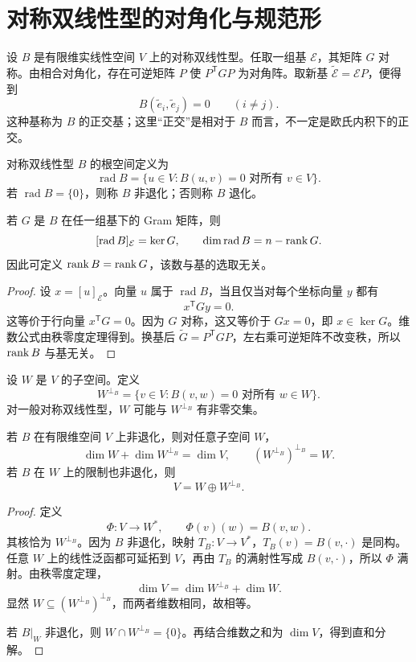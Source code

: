 \section{对称双线性型的对角化与规范形}

设 $B$ 是有限维实线性空间 $V$ 上的对称双线性型。任取一组基 $\mathcal E$，其矩阵 $G$ 对称。由相合对角化，存在可逆矩阵 $P$ 使 $P^{\mathsf T}GP$ 为对角阵。取新基 $\widetilde{\mathcal E}=\mathcal E P$，便得到
\[
B(\widetilde e_i,\widetilde e_j)=0\qquad(i\ne j).
\]
这种基称为 $B$ 的正交基；这里“正交”是相对于 $B$ 而言，不一定是欧氏内积下的正交。

\begin{definition}[根空间与非退化性]
对称双线性型 $B$ 的根空间定义为
\[
\operatorname{rad}B
=\{u\in V:B(u,v)=0\text{ 对所有 }v\in V\}.
\]
若 $\operatorname{rad}B=\{0\}$，则称 $B$ 非退化；否则称 $B$ 退化。
\end{definition}

\begin{proposition}
若 $G$ 是 $B$ 在任一组基下的 Gram 矩阵，则
\[
[\operatorname{rad}B]_{\mathcal E}=\ker G,\qquad
\dim\operatorname{rad}B=n-\operatorname{rank} G.
\]
因此可定义 $\operatorname{rank} B=\operatorname{rank} G$，该数与基的选取无关。
\end{proposition}
\begin{proof}
设 $x=[u]_{\mathcal E}$。向量 $u$ 属于 $\operatorname{rad}B$，当且仅当对每个坐标向量 $y$ 都有
\[
x^{\mathsf T}Gy=0.
\]
这等价于行向量 $x^{\mathsf T}G=0$。因为 $G$ 对称，这又等价于 $Gx=0$，即 $x\in\ker G$。维数公式由秩零度定理得到。换基后 $\widetilde G=P^{\mathsf T}GP$，左右乘可逆矩阵不改变秩，所以 $\operatorname{rank} B$ 与基无关。
\end{proof}

\begin{definition}[$B$-正交补]
设 $W$ 是 $V$ 的子空间。定义
\[
W^{\perp_B}
=\{v\in V:B(v,w)=0\text{ 对所有 }w\in W\}.
\]
对一般对称双线性型，$W$ 可能与 $W^{\perp_B}$ 有非零交集。
\end{definition}

\begin{theorem}[非退化双线性型的正交补]
若 $B$ 在有限维空间 $V$ 上非退化，则对任意子空间 $W$，
\[
\dim W+\dim W^{\perp_B}=\dim V,
\qquad
(W^{\perp_B})^{\perp_B}=W.
\]
若 $B$ 在 $W$ 上的限制也非退化，则
\[
V=W\oplus W^{\perp_B}.
\]
\end{theorem}
\begin{proof}
定义
\[
\Phi:V\to W^*,\qquad \Phi(v)(w)=B(v,w).
\]
其核恰为 $W^{\perp_B}$。因为 $B$ 非退化，映射 $T_B:V\to V^*$，$T_B(v)=B(v,\cdot)$ 是同构。任意 $W$ 上的线性泛函都可延拓到 $V$，再由 $T_B$ 的满射性写成 $B(v,\cdot)$，所以 $\Phi$ 满射。由秩零度定理，
\[
\dim V=\dim W^{\perp_B}+\dim W.
\]
显然 $W\subseteq(W^{\perp_B})^{\perp_B}$，而两者维数相同，故相等。

若 $B|_W$ 非退化，则 $W\cap W^{\perp_B}=\{0\}$。再结合维数之和为 $\dim V$，得到直和分解。
\end{proof}

